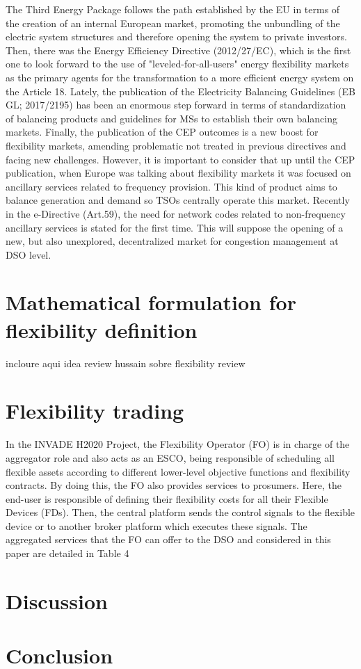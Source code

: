 The Third Energy Package follows the path established by the EU in terms of the creation of
an internal European market, promoting the unbundling of the electric system structures and therefore opening the system to private investors. Then, there was the Energy Efficiency Directive
(2012/27/EC), which is the first one to look forward to the use of "leveled-for-all-users"
energy flexibility markets as the primary agents for the transformation to a more efficient energy
system on the Article 18. Lately, the publication of the Electricity Balancing Guidelines (EB
GL; 2017/2195) has been an enormous step forward in terms of standardization of balancing
products and guidelines for MSs to establish their own balancing markets. Finally, the publication
of the CEP outcomes is a new boost for flexibility markets, amending problematic not
treated in previous directives and facing new challenges. 
However, it is important to consider that up until the CEP publication, when Europe was talking
about flexibility markets it was focused on ancillary services related to frequency provision.
This kind of product aims to balance generation and demand so TSOs centrally operate this market.
Recently in the e-Directive (Art.59), the need for network codes related to non-frequency
ancillary services is stated for the first time. This will suppose the opening of a new, but also
unexplored, decentralized market for congestion management at DSO level.

\section{Mathematical formulation for flexibility definition}
incloure aqui idea review hussain sobre flexibility review 


\section{Flexibility trading}
In the INVADE H2020 Project, the Flexibility Operator (FO) is in charge of the aggregator role and also acts as an ESCO, being responsible of scheduling all flexible assets according to different lower-level objective functions and flexibility contracts. By doing this, the FO also provides services to prosumers. Here, the end-user is responsible of defining their flexibility costs for all their Flexible Devices (FDs). Then, the central platform sends the control signals to the flexible device or to another broker platform which executes these signals. The aggregated services that the FO can offer to the DSO and considered in this paper are detailed in Table 4


\section{Discussion}
\section{Conclusion}

	


